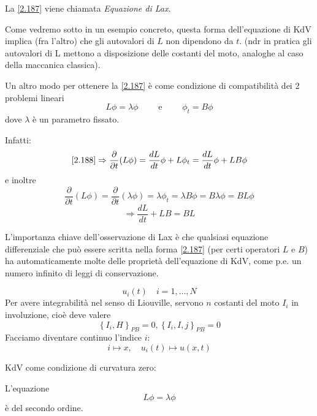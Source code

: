 \documentclass[a4paper,11pt]{report}
\begin{document}
\medskip

La \eqref{2.187} viene chiamata \emph{Equazione di Lax}.

Come vedremo sotto in un esempio concreto, questa forma dell'equazione di KdV implica (fra l'altro) che gli autovalori di $L$ non dipendono da $t$. (ndr in pratica gli autovalori di L mettono a disposizione delle costanti del moto, analoghe al caso della maccanica classica). 

Un altro modo per ottenere la \eqref{2.187} \`e come condizione di compatibilit\`a dei 2 problemi lineari
\begin{equation}
L\phi =\lambda \phi \qquad \text{ e } \qquad \phi_t = B\phi
\label{2.188}
\end{equation}
dove $\lambda$ è un parametro fissato.

Infatti: 
\[
\eqref{2.188}\Rightarrow \frac{\partial}{\partial t}(L\phi) = \frac{dL}{dt}\phi + L\phi_t = \frac{dL}{dt}\phi + LB\phi
\]
e inoltre
\[
\frac{\partial}{\partial t}(L\phi) = \frac{\partial}{\partial t}(\lambda \phi) = \lambda \phi_t = \lambda B \phi = B\lambda\phi = BL\phi
\]
\[
\Rightarrow \frac{dL}{dt} + LB = BL
\]

L'importanza chiave dell'osservazione di Lax \`e che qualsiasi equazione differenziale che pu\`o essere scritta nella forma \eqref{2.187} (per certi operatori $L$ e $B$) ha automaticamente molte delle propriet\`a dell'equazione di KdV, come p.e. un numero infinito di leggi di conservazione.

\medskip

\[
u_i(t) \quad i=1,\dots,N
\]
Per avere integrabilit\`a nel senso di Liouville, servono $n$ costanti del moto $I_i$ in involuzione, cio\`e deve valere 
\[
\left\{I_i,H \right\}_{PB}=0, \left\{I_i,I,j\right\}_{PB}=0
\]
Facciamo diventare continuo l'indice $i$:
\[
i\mapsto x,\quad u_i(t)\mapsto u(x,t)
\]

\medskip

KdV come condizione di curvatura zero:

L'equazione
\[
L\phi = \lambda \phi
\]
\`e del secondo ordine. 
\end{document}

